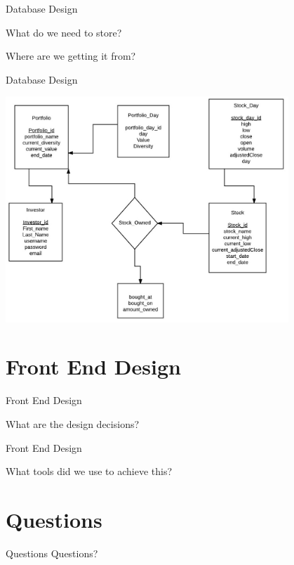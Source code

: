 \documentclass{beamer}
\begin{document}
\begin{frame}{Database Design}

What do we need to store?

Where are we getting it from?

\end{frame}


\begin{frame}{Database Design}

\centering
\includegraphics[width=0.8\textwidth]{db_diagram}

\end{frame}

\section{Front End Design}

\begin{frame}{Front End Design}

What are the design decisions?

\end{frame}

\begin{frame}{Front End Design}

What tools did we use to achieve this?

\end{frame}

\section*{Questions}
\begin{frame}{Questions}
\centering
Questions?
\end{frame}
\end{document}
